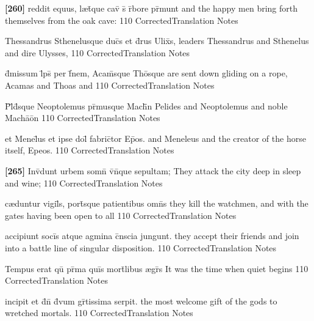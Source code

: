 \latline
  {\textbf{[260]} reddit equus, l{\ae}t\={\macron {\i}}que cav\={} s\={} r\={}bore pr\={}munt}
  { and the happy men bring forth themselves from the oak cave: }
  {110}
  { CorrectedTranslation }
  { Notes }


\latline
  {Thessandrus Sthenelusque duc\={}s et d\={\macron {\i}}rus Ulix\={}s,}
  { leaders Thessandrus and Sthenelus and dire Ulysses, }
  {110}
  { CorrectedTranslation }
  { Notes }


\latline
  {d\={}missum l\={}ps\={\macron {\i}} per f\={}nem, Acam\={}sque Tho\={}sque}
  { are sent down gliding on a rope, Acamas and Thoas and  }
  {110}
  { CorrectedTranslation }
  { Notes }


\latline
  {P\={}l\={\macron {\i}}d\={}sque Neoptolemus pr\={\macron {\i}}musque Mach\={}\={}n}
  { Pelides and Neoptolemus and noble Mach\={a}\={o}n }
  {110}
  { CorrectedTranslation }
  { Notes }


\latline
  {et Menel\={}us et ipse dol\={\macron {\i}} fabric\={}tor Ep\={}os.}
  { and Meneleus and the creator of the horse itself, Epeos. }
  {110}
  { CorrectedTranslation }
  { Notes }


\latline
  {\textbf{[265]} Inv\={}dunt urbem somn\={} v\={\macron {\i}}n\={}que sepultam;}
  { They attack the city deep in sleep and wine;  }
  {110}
  { CorrectedTranslation }
  { Notes }


\latline
  {c{\ae}duntur vigil\={}s, port\={\macron {\i}}sque patientibus omn\={\macron {\i}}s}
  { they kill the watchmen, and with the gates having been open to all }
  {110}
  { CorrectedTranslation }
  { Notes }


\latline
  {accipiunt soci\={}s atque agmina c\={}nscia jungunt.}
  { they accept their friends and join into a battle line of singular disposition. }
  {110}
  { CorrectedTranslation }
  { Notes }


\latline
  {Tempus erat qu\={} pr\={\macron {\i}}ma qui\={}s mort\={}libus {\ae}gr\={\macron {\i}}s}
  { It was the time when quiet begins  }
  {110}
  { CorrectedTranslation }
  { Notes }


\latline
  {incipit et d\={}n\={} d\={\macron {\i}}vum gr\={}tissima serpit.}
  { the most welcome gift of the gods to wretched mortals. }
  {110}
  { CorrectedTranslation }
  { Notes }


